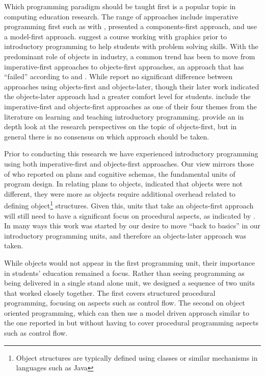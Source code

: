Which programming paradigm should be taught first is a popular topic in computing education research. The range of approaches include imperative programming first such as with \citet{Koffman:1988a}, \citet{Howe:2004} presented a components-first approach, and \citet{Bennedsen:2004} use a model-first approach. \citet{Cooper:2003} suggest a course working with graphics prior to introductory programming to help students with problem solving skills. With the predominant role of objects in industry, a common trend has been to move from imperative-first approaches to objects-first approaches, an approach that has ``failed'' according to \citet{Astrachan:2005} and \citet{Reges:2006}. While \citet{Ehlert:2009} report no significant difference between approaches using objects-first and objects-later, though their later work \cite{Ehlert:2010} indicated the objects-later approach had a greater comfort level for students. \citet{Robins:2003} include the imperative-first and objects-first approaches as one of their four themes from the literature on learning and teaching introductory programming. \citet{Lister:2006a} provide an in depth look at the research perspectives on the topic of objects-first, but in general there is no consensus on which approach should be taken.

Prior to conducting this research we have experienced introductory programming using both imperative-first and objects-first approaches. Our view mirrors those of \citet{Rist:1996} who reported on plans and cognitive schemas, the fundamental units of program design. In relating plans to objects, \citet{Rist:1996} indicated that objects were not different, they were more as objects require additional overhead related to defining object\footnote{Object structures are typically defined using classes or similar mechanisms in languages such as Java} structures. Given this, units that take an objects-first approach will still need to have a significant focus on procedural aspects, as indicated by \citet{Robins:2003}. In many ways this work was started by our desire to move ``back to basics'' \cite{Reges:2006} in our introductory programming units, and therefore an objects-later approach was taken.

While objects would not appear in the first programming unit, their importance in students' education remained a focus. Rather than seeing programming as being delivered in a single stand alone unit, we designed a sequence of two units that worked closely together. The first covers structured procedural programming, focusing on aspects such as control flow. The second on object oriented programming, which can then use a model driven approach similar to the one reported in \citet{Bennedsen:2004} but without having to cover procedural programming aspects such as control flow.

